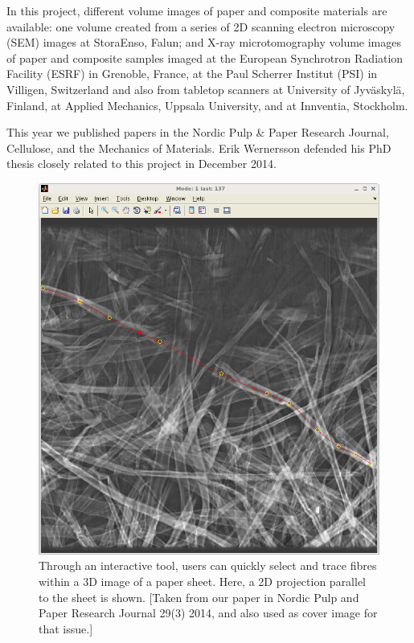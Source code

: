 \documentclass[10pt, a4paper]{article}
\begin{document}
{\begin{enumerate}
{		In this project, different volume images of paper and composite materials are available: one volume
		created from a series of 2D scanning electron microscopy (SEM) images at StoraEnso, Falun; and
		X-ray microtomography volume images of paper and composite samples imaged at the European
		Synchrotron Radiation Facility (ESRF) in Grenoble, France, at the Paul Scherrer Institut (PSI) in
		Villigen, Switzerland and also from tabletop scanners at University of Jyv\"{a}skyl\"{a}, Finland,
		at Applied Mechanics, Uppsala University, and at Innventia, Stockholm.
		
		This year we published papers in the Nordic Pulp \& Paper Research Journal,
		Cellulose, and the Mechanics of Materials. Erik Wernersson defended his PhD thesis closely related to this project in December 2014.}
	
	\begin{figure}[!h]
		\centering
		
		\includegraphics[width=0.48\linewidth]{figures/research/eric.png}
		\caption{Through an interactive tool, users can quickly select and trace fibres within a 3D image of a paper sheet. Here, a 2D projection parallel to the sheet is shown. [Taken from our paper in Nordic Pulp and Paper Research Journal 29(3) 2014, and also used as cover image for that issue.]}
		\label{fig:woodseg}
	\end{figure}
	
	
	
	
	
	

\end{enumerate}}
\end{document}

